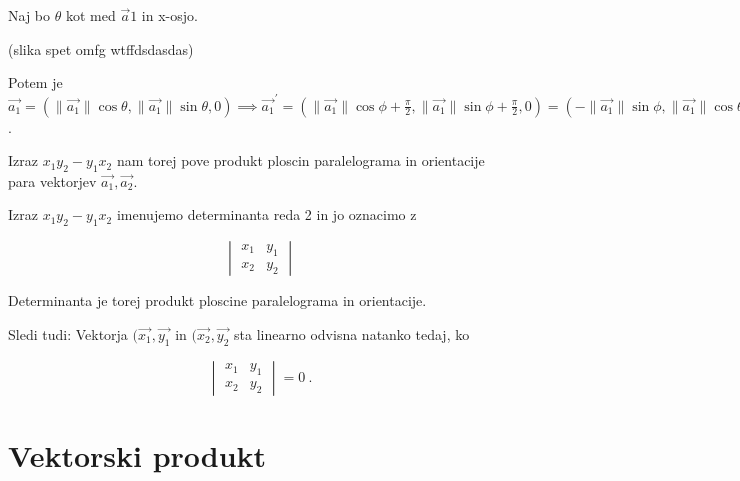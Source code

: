 \documentclass{report}
\begin{document}
{\begin{enumerate}
		Naj bo $\theta$ kot med $\vec{a}1$ in x-osjo.

		(slika spet omfg wtffdsdasdas)

		Potem je $\vec{a_1} = ( \|\vec{a_1}\| \cos \theta, \|\vec{a_1}\| \sin \theta , 0)  \implies \vec{a_1}^{\prime} =  (\|\vec{a_1}\| \cos{\phi + \frac{\pi}{2}} , \|\vec{a_1}\| \sin{\phi + \frac{\pi}{2}}, 0)  = ( - \|\vec{a_1}\| \sin \phi, \|\vec{a_1}\| \cos \theta ,0) = (- y_1, x_1,0) \implies P = \vec{a_1}^{\prime} \vec{a_2} = -y_1 x_2 + x_1 y_2$.

	\end{enumerate}
}

Izraz $x_1 y_2 - y_1 x_2$ nam torej pove produkt ploscin paralelograma in orientacije para vektorjev $\vec{a_1},\vec{a_2}$.

Izraz $x_1 y_2 - y_1 x_2$ imenujemo determinanta reda 2 in jo oznacimo z

\[
\begin{vmatrix}
     x_1 & y_1 \\
     x_2 & y_2
\end{vmatrix}
\]

Determinanta je torej produkt ploscine paralelograma in orientacije.


Sledi tudi: Vektorja $(\vec{x_1},\vec{y_1}$ in $(\vec{x_2},\vec{y_2}$ sta linearno odvisna natanko tedaj, ko

\[
\begin{vmatrix}
     x_1 & y_1 \\
     x_2 & y_2
\end{vmatrix}  = 0
\
.\]


\section{Vektorski produkt}

\end{document}
